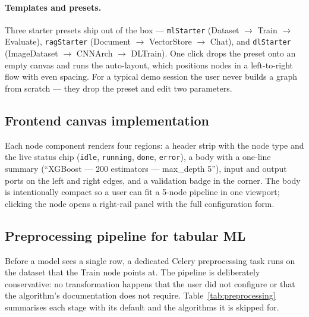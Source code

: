 \documentclass[12pt, a4paper, oneside]{report}
\begin{document}
\paragraph{Templates and presets.} Three starter presets ship out of
the box --- \texttt{mlStarter} (Dataset $\to$ Train $\to$ Evaluate),
\texttt{ragStarter} (Document $\to$ VectorStore $\to$ Chat), and
\texttt{dlStarter} (ImageDataset $\to$ CNNArch $\to$ DLTrain). One
click drops the preset onto an empty canvas and runs the
auto-layout, which positions nodes in a left-to-right flow with
even spacing. For a typical demo session the user never builds a
graph from scratch --- they drop the preset and edit two
parameters.

\subsection{Frontend canvas implementation}


Each node component renders four regions: a header strip with the
node type and the live status chip (\texttt{idle}, \texttt{running},
\texttt{done}, \texttt{error}), a body with a one-line summary
(``XGBoost --- 200 estimators --- max\_depth 5''), input and output
ports on the left and right edges, and a validation badge in the
corner. The body is intentionally compact so a user can fit a 5-node
pipeline in one viewport; clicking the node opens a right-rail panel
with the full configuration form.

\subsection{Preprocessing pipeline for tabular ML}

Before a model sees a single row, a dedicated Celery preprocessing
task runs on the dataset that the Train node points at. The pipeline
is deliberately conservative: no transformation happens that the user
did not configure or that the algorithm's documentation does not
require. Table~\ref{tab:preprocessing} summarises each stage with
its default and the algorithms it is skipped for.
\end{document}
